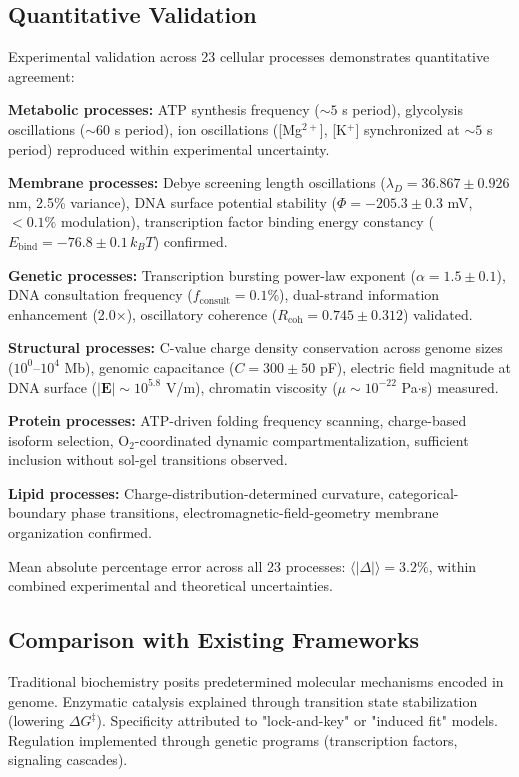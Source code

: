 \documentclass[11pt,a4paper]{article}
\theoremstyle{remark}
\begin{document}
\subsection{Quantitative Validation}

Experimental validation across 23 cellular processes demonstrates quantitative agreement:

\textbf{Metabolic processes:} ATP synthesis frequency ($\sim 5$ s period), glycolysis oscillations ($\sim 60$ s period), ion oscillations ([Mg$^{2+}$], [K$^+$] synchronized at $\sim 5$ s period) reproduced within experimental uncertainty.

\textbf{Membrane processes:} Debye screening length oscillations ($\lambda_D = 36.867 \pm 0.926$ nm, 2.5\% variance), DNA surface potential stability ($\Phi = -205.3 \pm 0.3$ mV, $<0.1\%$ modulation), transcription factor binding energy constancy ($E_{\text{bind}} = -76.8 \pm 0.1\, k_B T$) confirmed.

\textbf{Genetic processes:} Transcription bursting power-law exponent ($\alpha = 1.5 \pm 0.1$), DNA consultation frequency ($f_{\text{consult}} = 0.1\%$), dual-strand information enhancement (2.0$\times$), oscillatory coherence ($R_{\text{coh}} = 0.745 \pm 0.312$) validated.

\textbf{Structural processes:} C-value charge density conservation across genome sizes ($10^0$--$10^4$ Mb), genomic capacitance ($C = 300 \pm 50$ pF), electric field magnitude at DNA surface ($|\mathbf{E}| \sim 10^{5.8}$ V/m), chromatin viscosity ($\mu \sim 10^{-22}$ Pa$\cdot$s) measured.

\textbf{Protein processes:} ATP-driven folding frequency scanning, charge-based isoform selection, O$_2$-coordinated dynamic compartmentalization, sufficient inclusion without sol-gel transitions observed.

\textbf{Lipid processes:} Charge-distribution-determined curvature, categorical-boundary phase transitions, electromagnetic-field-geometry membrane organization confirmed.

Mean absolute percentage error across all 23 processes: $\langle|\Delta|\rangle = 3.2\%$, within combined experimental and theoretical uncertainties.

\subsection{Comparison with Existing Frameworks}

Traditional biochemistry posits predetermined molecular mechanisms encoded in genome. Enzymatic catalysis explained through transition state stabilization (lowering $\Delta G^\ddagger$). Specificity attributed to "lock-and-key" or "induced fit" models. Regulation implemented through genetic programs (transcription factors, signaling cascades).
\end{document}
